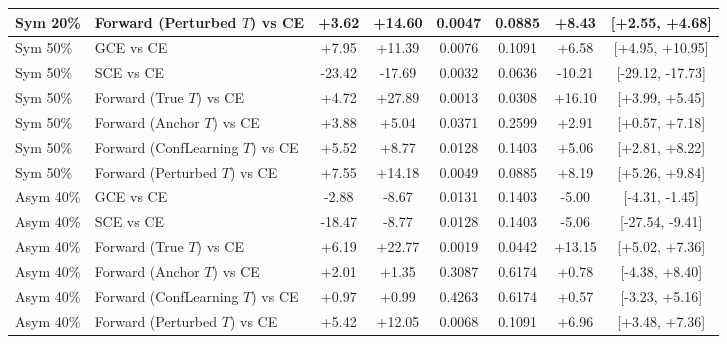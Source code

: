 \documentclass[journal]{IEEEtran}
\theoremstyle{definition}
\begin{document}
\begin{table}[t]
\begin{tabular}{llcccccc}
Sym 20\% & Forward (Perturbed $T$) vs CE & +3.62 & +14.60 & 0.0047 & 0.0885 & +8.43 & [+2.55, +4.68] \\
\midrule
Sym 50\% & GCE vs CE & +7.95 & +11.39 & 0.0076 & 0.1091 & +6.58 & [+4.95, +10.95] \\
Sym 50\% & SCE vs CE & -23.42 & -17.69 & 0.0032 & 0.0636 & -10.21 & [-29.12, -17.73] \\
Sym 50\% & Forward (True $T$) vs CE & +4.72 & +27.89 & 0.0013 & 0.0308 & +16.10 & [+3.99, +5.45] \\
Sym 50\% & Forward (Anchor $T$) vs CE & +3.88 & +5.04 & 0.0371 & 0.2599 & +2.91 & [+0.57, +7.18] \\
Sym 50\% & Forward (ConfLearning $T$) vs CE & +5.52 & +8.77 & 0.0128 & 0.1403 & +5.06 & [+2.81, +8.22] \\
Sym 50\% & Forward (Perturbed $T$) vs CE & +7.55 & +14.18 & 0.0049 & 0.0885 & +8.19 & [+5.26, +9.84] \\
\midrule
Asym 40\% & GCE vs CE & -2.88 & -8.67 & 0.0131 & 0.1403 & -5.00 & [-4.31, -1.45] \\
Asym 40\% & SCE vs CE & -18.47 & -8.77 & 0.0128 & 0.1403 & -5.06 & [-27.54, -9.41] \\
Asym 40\% & Forward (True $T$) vs CE & +6.19 & +22.77 & 0.0019 & 0.0442 & +13.15 & [+5.02, +7.36] \\
Asym 40\% & Forward (Anchor $T$) vs CE & +2.01 & +1.35 & 0.3087 & 0.6174 & +0.78 & [-4.38, +8.40] \\
Asym 40\% & Forward (ConfLearning $T$) vs CE & +0.97 & +0.99 & 0.4263 & 0.6174 & +0.57 & [-3.23, +5.16] \\
Asym 40\% & Forward (Perturbed $T$) vs CE & +5.42 & +12.05 & 0.0068 & 0.1091 & +6.96 & [+3.48, +7.36] \\
\bottomrule
\end{tabular}
\end{table}
\end{document}
